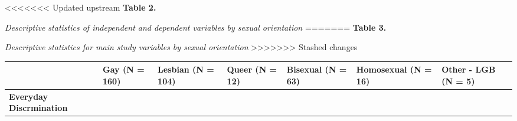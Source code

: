 \documentclass[
  english,
  man,floatsintext]{apa6}
\begin{document}
<<<<<<< Updated upstream
\textbf{Table 2.}

\emph{Descriptive statistics of independent and dependent variables by sexual orientation}
=======
\textbf{Table 3.}

\emph{Descriptive statistics for main study variables by sexual orientation}
>>>>>>> Stashed changes

\begin{longtable}[]{@{}lllllll@{}}
\toprule
\begin{minipage}[b]{0.16\columnwidth}\raggedright
\strut
\end{minipage} & \begin{minipage}[b]{0.11\columnwidth}\raggedright
Gay (N = 160)\strut
\end{minipage} & \begin{minipage}[b]{0.11\columnwidth}\raggedright
Lesbian (N = 104)\strut
\end{minipage} & \begin{minipage}[b]{0.11\columnwidth}\raggedright
Queer (N = 12)\strut
\end{minipage} & \begin{minipage}[b]{0.11\columnwidth}\raggedright
Bisexual (N = 63)\strut
\end{minipage} & \begin{minipage}[b]{0.11\columnwidth}\raggedright
Homosexual (N = 16)\strut
\end{minipage} & \begin{minipage}[b]{0.11\columnwidth}\raggedright
Other - LGB (N = 5)\strut
\end{minipage}\tabularnewline
\midrule
\endhead
\begin{minipage}[t]{0.16\columnwidth}\raggedright
\textbf{Everyday Discrmination}\strut
\end{minipage} & \begin{minipage}[t]{0.11\columnwidth}\raggedright
~~\strut
\end{minipage} & \begin{minipage}[t]{0.11\columnwidth}\raggedright
~~\strut
\end{minipage} & \begin{minipage}[t]{0.11\columnwidth}\raggedright
~~\strut
\end{minipage} & \begin{minipage}[t]{0.11\columnwidth}\raggedright
~~\strut
\end{minipage} & \begin{minipage}[t]{0.11\columnwidth}\raggedright
~~\strut
\end{minipage} & \begin{minipage}[t]{0.11\columnwidth}\raggedright

\end{minipage}
\end{longtable}
\end{document}
